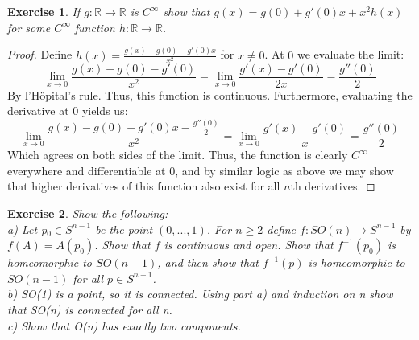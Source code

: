 \documentclass{article}
\newtheorem{exercise}{Exercise}
\begin{document}
\begin{exercise}
  If $g:\mathbb{R} \to \mathbb{R}$ is $C^{\infty}$ show that $g(x) = g(0) + g'(0)x + x^{2}h(x)$ for some $C^{\infty}$ function $h: \mathbb{R} \to \mathbb{R}$.
\end{exercise}
\begin{proof}
  Define $h(x) = \frac{g(x) - g(0) - g'(0)x}{x^{2}}$ for $x \neq 0$. At $0$ we evaluate the limit:
  \[
    \lim_{x \to 0}\frac{g(x)-g(0) - g'(0)}{x^{2}} = \lim_{{x \to 0}}\frac{g'(x) - g'(0)}{2x} = \frac{g''(0)}{2}
  \]
  By l'H\"opital's rule. Thus, this function is continuous. Furthermore, evaluating the derivative at 0 yields us:
  \[
    \lim_{x\to 0} \frac{g(x)-g(0)-g'(0)x - \frac{g''(0)}{2}}{x^{2}} = \lim_{x\to 0}\frac{g'(x) - g'(0)}{x} = \frac{g''(0)}{2}
  \]
  Which agrees on both sides of the limit. Thus, the function is clearly $C^{\infty}$ everywhere and differentiable at 0, and by similar logic as above we may show that higher derivatives of this function also exist for all $n$th derivatives. 
\end{proof}

\newpage

\begin{exercise}
  Show the following: \\
  a) Let p$_{0} \in S^{n-1}$ be the point $(0,...,1)$. For $n \geq 2$ define $f: SO(n) \to S^{n-1}$ by $f(A) = A(p_{0})$. Show that $f$ is continuous and open. Show that $f^{-1}(p_{0})$ is homeomorphic to $SO(n-1)$, and then show that $f^{-1}(p)$ is homeomorphic to $SO(n-1)$ for all $p \in S^{n-1}$. \\
  b) SO(1) is a point, so it is connected. Using part a) and induction on n show that SO(n) is connected for all n.\\
  c) Show that O(n) has exactly two components. 
\end{exercise}
\end{document}
